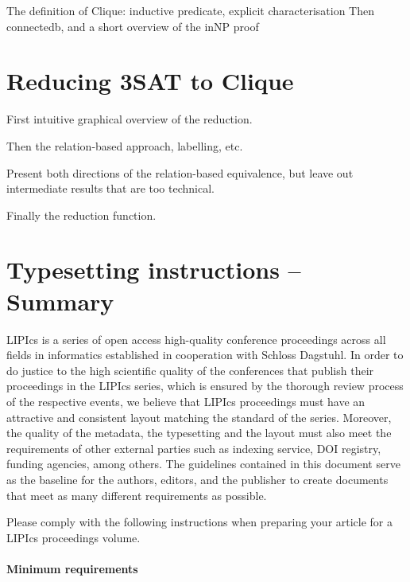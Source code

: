 \documentclass[a4paper,UKenglish,cleveref, autoref]{lipics-v2019}
\begin{document}
The definition of Clique: inductive predicate, explicit characterisation
Then connectedb, and a short overview of the inNP proof

\section{Reducing \textbf{3SAT} to \textbf{Clique}}

First intuitive graphical overview of the reduction.

Then the relation-based approach, labelling, etc.

Present both directions of the relation-based equivalence, but leave out intermediate results that are too technical.

Finally the reduction function. 

\section{Typesetting instructions -- Summary}
\label{sec:typesetting-summary}

LIPIcs is a series of open access high-quality conference proceedings across all fields in informatics established in cooperation with Schloss Dagstuhl. 
In order to do justice to the high scientific quality of the conferences that publish their proceedings in the LIPIcs series, which is ensured by the thorough review process of the respective events, we believe that LIPIcs proceedings must have an attractive and consistent layout matching the standard of the series.
Moreover, the quality of the metadata, the typesetting and the layout must also meet the requirements of other external parties such as indexing service, DOI registry, funding agencies, among others. The guidelines contained in this document serve as the baseline for the authors, editors, and the publisher to create documents that meet as many different requirements as possible. 

Please comply with the following instructions when preparing your article for a LIPIcs proceedings volume. 
\paragraph*{Minimum requirements}
\end{document}
